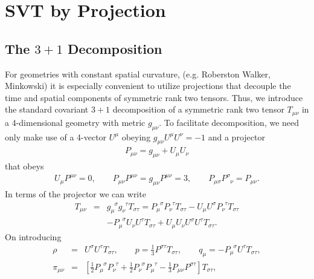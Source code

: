 
\chapter{SVT by Projection}
\label{aa:svt_projection}

\section{The $3+1$ Decomposition}
\label{aas:3_1_decomp}

For geometries with constant spatial curvature, (e.g. Roberston Walker, Minkowski) it is especially convenient to utilize projections that decouple the time and spatial components of symmetric rank two tensors. Thus, we introduce the standard covariant $3+1$ decomposition of a symmetric rank two tensor $T_{\mu\nu}$ in a 4-dimensional geometry with metric $g_{\mu\nu}$. To facilitate decomposition, we need only make use of a 4-vector $U^{\mu}$ obeying $g_{\mu\nu}U^{\mu}U^{\nu}=-1$ and a projector 
%
\begin{eqnarray}
P_{\mu\nu}=g_{\mu\nu}+U_{\mu}U_{\nu}
\label{E1}
\end{eqnarray}
%
that obeys
%
\begin{eqnarray}
U_{\mu}P^{\mu\nu}=0, \qquad P_{\mu\nu}P^{\mu\nu}=g_{\mu\nu}P^{\mu\nu}=3,\qquad P_{\mu\sigma}P^{\sigma}_{\phantom{\sigma}\nu}=P_{\mu\nu}.
\label{E2}
\end{eqnarray}
%
In terms of the projector we can write
%
\begin{eqnarray}
T_{\mu\nu}&=&g_{\mu}^{\phantom{\mu}\sigma}g_{\nu}^{\phantom{\nu}\tau}T_{\sigma\tau}=
P_{\mu}^{\phantom{\mu}\sigma}P_{\nu}^{\phantom{\nu}\tau}T_{\sigma\tau}
-U_{\mu}U^{\sigma}P_{\nu}^{\phantom{\nu}\tau}T_{\sigma\tau}
\nonumber\\
&&
-P_{\mu}^{\phantom{\mu}\sigma}U_{\nu}U^{\tau}T_{\sigma\tau}
+U_{\mu}U_{\nu}U^{\sigma}U^{\tau}T_{\sigma\tau}.
\label{E3}
\end{eqnarray}
%
On introducing
%
\begin{eqnarray}
\rho&=&U^{\sigma}U^{\tau}T_{\sigma\tau},\qquad p=\frac{1}{3}P^{\sigma\tau}T_{\sigma\tau},\qquad 
q_{\mu}=-P_{\mu}^{\phantom{\mu}\sigma}U^{\tau}T_{\sigma\tau},
\nonumber\\
\pi_{\mu\nu}&=&\left[\frac{1}{2}P_{\mu}^{\phantom{\mu}\sigma}P_{\nu}^{\phantom{\nu}\tau}
+\frac{1}{2}P_{\nu}^{\phantom{\nu}\sigma}P_{\mu}^{\phantom{\mu}\tau}
-\frac{1}{3}P_{\mu\nu}P^{\sigma\tau}\right]T_{\sigma\tau},
\label{E4}
\end{eqnarray}
